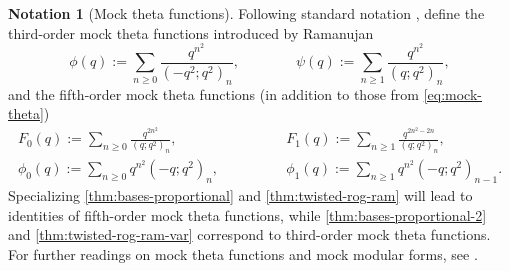 \documentclass[reqno,11pt]{amsart}
\theoremstyle{definition}
\newtheorem{notation}[theorem]{Notation}
\theoremstyle{remark}
\numberwithin{equation}{section}
\begin{document}
\begin{notation}[Mock theta functions] \label{not:mock-theta}
Following standard notation \cite{andrews1989ramanujan,chen2012partition,andrews1986fifth,andersen2016vector}, define the third-order mock theta functions introduced by Ramanujan \cite[p.~220]{ramanujan1995ramanujan}
\[
    \phi(q) := \sum_{n \ge 0} \frac{q^{n^2}}{\left(-q^2; q^2\right)_n},
    \qquad\qquad 
    \psi(q) := \sum_{n \ge 1} \frac{q^{n^2}}{\left(q; q^2\right)_n},
\]
and the fifth-order mock theta functions (in addition to those from \cref{eq:mock-theta})
\[
\begin{aligned}
    F_0(q) := \sum_{n \ge 0} \frac{q^{2n^2}}{\left(q; q^2\right)_n},&
    \qquad\qquad 
    F_1(q) := \sum_{n \ge 1} \frac{q^{2n^2 - 2n}}{\left(q; q^2\right)_n},
    \\
    \phi_0(q) := \sum_{n \ge 0} q^{n^2} \left(-q; q^2\right)_n,&
    \qquad\qquad 
    \phi_1(q) := \sum_{n \ge 1} q^{n^2} \left(-q; q^2\right)_{n-1}.
\end{aligned}
\]
Specializing 
\cref{thm:bases-proportional} and \cref{thm:twisted-rog-ram} will lead to identities of fifth-order mock theta functions, while \cref{thm:bases-proportional-2} and \cref{thm:twisted-rog-ram-var} correspond to third-order mock theta functions. For further readings on mock theta functions and mock modular forms, see \cite{gordon2012survey,zagier2009ramanujan,bringmann2017harmonic}. 
\end{notation}
\end{document}
